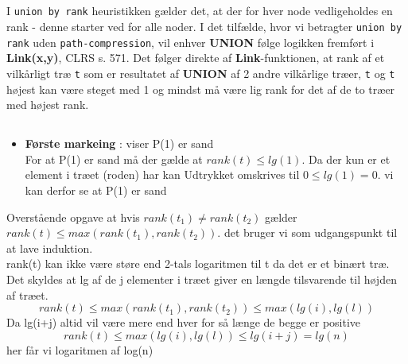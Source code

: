 \documentclass[a4paper,10pt]{article}
\begin{document}
\subsection{}
I \texttt{union by rank} heuristikken gælder det, at der for hver node vedligeholdes en rank - denne starter ved for alle noder. I det tilfælde, hvor vi betragter \texttt{union by rank} uden \texttt{path-compression}, vil enhver \textbf{UNION} følge logikken fremført i \textbf{Link(x,y)}, CLRS s. 571. Det følger direkte af \textbf{Link}-funktionen, at rank af et vilkårligt træ \texttt{t} som er resultatet af \textbf{UNION} af 2 andre vilkårlige træer, \texttt{t} og \texttt{t} højest kan være steget med 1 og mindst må være lig rank for det af de to træer med højest rank.
\\


\subsection{}
\subsection{}

\begin{itemize}
    \item \textbf{Første markeing} : viser P(1) er sand\\


For at P(1) er sand må der gælde at $rank(t)\leq lg(1)$. Da der kun er et element i træet (roden) har kan Udtrykket omskrives til $0\leq lg(1)=0$. vi kan derfor se at P(1) er sand\\

    
\end{itemize}
 Overstående opgave at hvis $rank(t_1)\neq rank(t_2)$ gælder $rank(t) \leq max(rank(t_1),rank(t_2))$. det bruger vi som udgangspunkt til at lave induktion. \\
 rank(t) kan ikke være støre end 2-tals logaritmen til t da det er et binært træ. Det skyldes at lg af de j elementer i træet giver en længde tilsvarende til højden af træet.
 $$rank(t) \leq max(rank(t_1),rank(t_2))\leq max(lg(i),lg(l))$$
 Da lg(i+j) altid vil være mere end hver for så længe de begge er positive 
 $$rank(t) \leq max(lg(i),lg(l)) \leq lg(i+j) = lg(n)$$ 
 her får vi logaritmen af log(n)


\subsection{}
\end{document}
